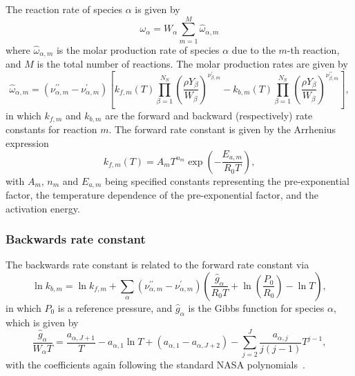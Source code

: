 \documentclass[notitlepage]{revtex4-1}
\begin{document}
The reaction rate of species $\alpha$ is given by
\begin{equation}\omega_{\alpha}=W_{\alpha}\displaystyle\sum_{m=1}^{M}\hat{\omega}_{\alpha,m}\end{equation}
where $\hat{\omega}_{\alpha,m}$ is the molar production rate of species $\alpha$ due to the $m$-th reaction, and $M$ is the total number of reactions. The molar production rates are given by
\begin{equation}\hat{\omega}_{\alpha,m}=\left(\nu^{\prime\prime}_{\alpha,m}-\nu^{\prime}_{\alpha,m}\right)\left[k_{f,m}\left(T\right)\displaystyle\prod_{\beta=1}^{N_{S}}\left(\frac{\rho{Y}_{\beta}}{W_{\beta}}\right)^{\nu^{\prime}_{\beta,m}}-k_{b,m}\left(T\right)\displaystyle\prod_{\beta=1}^{N_{S}}\left(\frac{\rho{Y}_{\beta}}{W_{\beta}}\right)^{\nu^{\prime\prime}_{\beta,m}}\right],\end{equation}
in which $k_{f,m}$ and $k_{b,m}$ are the forward and backward (respectively) rate constants for reaction $m$. The forward rate constant is given by the Arrhenius expression
\begin{equation}k_{f,m}\left(T\right)=A_{m}T^{n_{m}}\exp\left(-\frac{E_{a,m}}{R_{0}T}\right),\end{equation}
with $A_{m}$, $n_{m}$ and $E_{a,m}$ being specified constants representing the pre-exponential factor, the temperature dependence of the pre-exponential factor, and the activation energy.

\subsubsection{Backwards rate constant}

The backwards rate constant is related to the forward rate constant via
\begin{equation}\ln{k}_{b,m}=\ln{k}_{f,m} + \displaystyle\sum_{\alpha}\left(\nu^{\prime\prime}_{\alpha,m}-\nu^{\prime}_{\alpha,m}\right)\left(\frac{\hat{g}_{\alpha}}{R_{0}T}+\ln\left(\frac{P_{0}}{R_{0}}\right)-\ln{T}\right),\end{equation}
in which $P_{0}$ is a reference pressure, and $\hat{g}_{\alpha}$ is the Gibbs function for species $\alpha$, which is given by
\begin{equation}\frac{\hat{g}_{\alpha}}{W_{\alpha}T}=\frac{a_{\alpha,J+1}}{T}-a_{\alpha,1}\ln{T}+\left(a_{\alpha,1}-a_{\alpha,J+2}\right)-\displaystyle\sum_{j=2}^{J}\frac{a_{\alpha,j}}{j\left(j-1\right)}T^{j-1},\end{equation}
with the coefficients again following the standard NASA polynomials~\cite{gordon_1971}.
\end{document}
